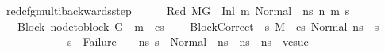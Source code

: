 \begin{isabellebody}
{\isafoldproof}%
%
\isadelimproof
\isanewline
%
\endisadelimproof
\isanewline
{}\isamarkupfalse%
\ red{\isacharunderscore}{\kern0pt}cfg{\isacharunderscore}{\kern0pt}multi{\isacharunderscore}{\kern0pt}backwards{\isacharunderscore}{\kern0pt}step{\isacharcolon}{\kern0pt}\isanewline
\ \ \isanewline
\ \ \ Red{\isacharcolon}{\kern0pt}\ {\isachardoublequoteopen}M{\isacharcomma}{\kern0pt}{\isasymLambda}{\isacharcomma}{\kern0pt}{\isasymGamma}{\isacharcomma}{\kern0pt}{\isasymOmega}{\isacharcomma}{\kern0pt}G\ {\isasymturnstile}\ {\isacharparenleft}{\kern0pt}Inl\ m{\isacharcomma}{\kern0pt}\ {\isacharparenleft}{\kern0pt}Normal\ \ n{\isacharunderscore}{\kern0pt}s{\isacharparenright}{\kern0pt}{\isacharparenright}{\kern0pt}\ {\isacharminus}{\kern0pt}n{\isasymrightarrow}{\isacharasterisk}{\kern0pt}\ {\isacharparenleft}{\kern0pt}m{\isacharprime}{\kern0pt}{\isacharcomma}{\kern0pt}\ s{\isacharprime}{\kern0pt}{\isacharparenright}{\kern0pt}{\isachardoublequoteclose}\ \isanewline
\ \ \ Block{\isacharcolon}{\kern0pt}\ {\isachardoublequoteopen}node{\isacharunderscore}{\kern0pt}to{\isacharunderscore}{\kern0pt}block\ G\ {\isacharbang}{\kern0pt}\ m\ {\isacharequal}{\kern0pt}\ cs{\isachardoublequoteclose}\ \isanewline
\ \ \ BlockCorrect{\isacharcolon}{\kern0pt}\ {\isachardoublequoteopen}{\isasymAnd}\ s{\isacharprime}{\kern0pt}{\isacharprime}{\kern0pt}{\isachardot}{\kern0pt}\ M{\isacharcomma}{\kern0pt}{\isasymLambda}{\isacharcomma}{\kern0pt}{\isasymGamma}{\isacharcomma}{\kern0pt}{\isasymOmega}\ {\isasymturnstile}\ {\isasymlangle}cs{\isacharcomma}{\kern0pt}\ Normal\ n{\isacharunderscore}{\kern0pt}s{\isasymrangle}\ {\isacharbrackleft}{\kern0pt}{\isasymrightarrow}{\isacharbrackright}{\kern0pt}\ s{\isacharprime}{\kern0pt}{\isacharprime}{\kern0pt}\ {\isasymLongrightarrow}\ \isanewline
\ \ \ \ \ \ \ \ \ \ \ \ s{\isacharprime}{\kern0pt}{\isacharprime}{\kern0pt}\ {\isasymnoteq}\ Failure\ {\isasymand}\ {\isacharparenleft}{\kern0pt}{\isasymforall}\ \ n{\isacharunderscore}{\kern0pt}s{\isacharprime}{\kern0pt}{\isachardot}{\kern0pt}\ {\isacharparenleft}{\kern0pt}{\isacharparenleft}{\kern0pt}s{\isacharprime}{\kern0pt}{\isacharprime}{\kern0pt}\ {\isacharequal}{\kern0pt}\ {\isacharparenleft}{\kern0pt}Normal\ \ n{\isacharunderscore}{\kern0pt}s{\isacharprime}{\kern0pt}{\isacharparenright}{\kern0pt}{\isacharparenright}{\kern0pt}\ {\isasymlongrightarrow}\ {\isacharparenleft}{\kern0pt}n{\isacharunderscore}{\kern0pt}s{\isacharprime}{\kern0pt}\ {\isacharequal}{\kern0pt}\ n{\isacharunderscore}{\kern0pt}s{\isacharparenright}{\kern0pt}\ {\isasymand}\ vcsuc{\isacharparenright}{\kern0pt}{\isacharparenright}{\kern0pt}{\isachardoublequoteclose}\ \isanewline

\end{isabellebody}
